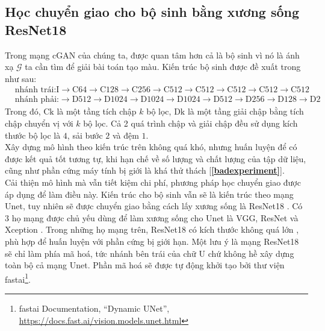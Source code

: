 \documentclass[a4paper, 12pt]{article}
\begin{document}
\subsection{Học chuyển giao cho bộ sinh bằng xương sống ResNet18}\label{transferlearning}
Trong mạng cGAN của chúng ta, được quan tâm hơn cả là bộ sinh vì nó là ánh xạ $\mathcal{G}$ ta cần tìm để giải bài toán tạo màu. Kiến trúc bộ sinh được đề xuất trong \cite{isola2018imagetoimage} như sau:
\begin{align*}
    &\text{nhánh trái:} \text{I} \rightarrow \text{C64} \rightarrow \text{C128} \rightarrow \text{C256} \rightarrow \text{C512} \rightarrow \text{C512} \rightarrow \text{C512} \rightarrow \text{C512} \rightarrow \text{C512}\\
    &\text{nhánh phải:} \rightarrow \text{D512} \rightarrow \text{D1024} \rightarrow \text{D1024} \rightarrow \text{D1024} \rightarrow \text{D512} \rightarrow \text{D256} \rightarrow \text{D128} \rightarrow \text{D2}
\end{align*}
Trong đó, $\text{Ck}$ là một tầng tích chập $k$ bộ lọc, $\text{Dk}$ là một tầng giải chập bằng tích chập chuyển vị với $k$ bộ lọc. Cả 2 quá trình chập và giải chập đều sử dụng kích thước bộ lọc là $4$, sải bước $2$ và đệm $1$.\vspace{5pt}\\
Xây dựng mô hình theo kiến trúc trên không quá khó, nhưng huấn luyện để có được kết quả tốt tương tự, khi hạn chế về số lượng và chất lượng của tập dữ liệu, cũng như phần cứng máy tính bị giới là khá thử thách [\textbf{\ref{badexperiment}}].\vspace{5pt}\\
Cải thiện mô hình mà vẫn tiết kiệm chi phí, phương pháp học chuyển giao được áp dụng để làm điều này. Kiến trúc cho bộ sinh vẫn sẽ là kiến trúc theo mạng Unet, tuy nhiên sẽ được chuyển giao bằng cách lấy xương sống là ResNet18 \cite{christopherresunet2019}. Có 3 họ mạng được chủ yếu dùng để làm xương sống cho Unet là VGG, ResNet và Xception \cite{backboneresnet2020}. Trong những họ mạng trên, ResNet18 có kích thước không quá lớn \cite{Khan_2020}, phù hợp để huấn luyện với phần cứng bị giới hạn. Một lưu ý là mạng ResNet18 sẽ chỉ làm phía mã hoá, tức nhánh bên trái của chữ U chứ không hề xây dựng toàn bộ cả mạng Unet. Phần mã hoá sẽ được tự động khởi tạo bởi thư viện fastai\footnote{fastai Documentation, ``Dynamic UNet'', \href{https://docs.fast.ai/vision.models.unet.html}{https://docs.fast.ai/vision.models.unet.html}}.

\end{document}
